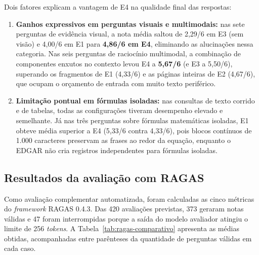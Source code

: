 Dois fatores explicam a vantagem de E4 na qualidade final das respostas:
\begin{enumerate}
    \item \textbf{Ganhos expressivos em perguntas visuais e multimodais:} nas sete perguntas de evidência visual, a nota média saltou de 2,29/6 em E3 (sem visão) e 4,00/6 em E1 para \textbf{4,86/6 em E4}, eliminando as alucinações nessa categoria. Nas seis perguntas de raciocínio multimodal, a combinação de componentes enxutos no contexto levou E4 a \textbf{5,67/6} (e E3 a 5,50/6), superando os fragmentos de E1 (4,33/6) e as páginas inteiras de E2 (4,67/6), que ocupam o orçamento de entrada com muito texto periférico.
    \item \textbf{Limitação pontual em fórmulas isoladas:} nas consultas de texto corrido e de tabelas, todas as configurações tiveram desempenho elevado e semelhante. Já nas três perguntas sobre fórmulas matemáticas isoladas, E1 obteve média superior a E4 (5,33/6 contra 4,33/6), pois blocos contínuos de 1.000 caracteres preservam as frases ao redor da equação, enquanto o EDGAR não cria registros independentes para fórmulas isoladas.
\end{enumerate}

\subsection{Resultados da avaliação com RAGAS}
\label{sec:resultados-ragas}

Como avaliação complementar automatizada, foram calculadas as cinco métricas do \textit{framework} RAGAS 0.4.3. Das 420 avaliações previstas, 373 geraram notas válidas e 47 foram interrompidas porque a saída do modelo avaliador atingiu o limite de 256 \textit{tokens}. A Tabela~\ref{tab:ragas-comparativo} apresenta as médias obtidas, acompanhadas entre parênteses da quantidade de perguntas válidas em cada caso.

